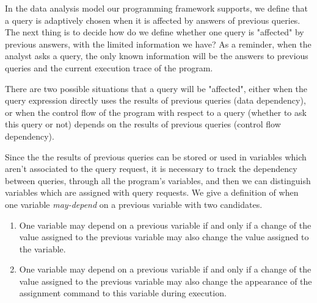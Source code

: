 
In the data analysis model our programming framework supports, 
   we define that a query is adaptively chosen when it is affected by answers of previous queries. The next thing is to decide how do we define whether one query is "affected" by previous answers, with the limited information we have? As a reminder, 
  when the analyst asks a query, the only known information will be the answers to previous queries and the current execution trace of the program.
 
 
 There are two possible situations that a query will be "affected",  
 either when the query expression directly uses the results of previous queries (data dependency), or when the control flow of the program with respect to a query (whether to ask this query or not) depends on the results of previous queries (control flow dependency).
 
 
 Since the the results of previous queries can be stored or used in variables
 which aren't associated to the query request,
 it is necessary to track the dependency between queries, through all the program's variables,  
 and then we can distinguish variables which are assigned with query requests.
  We give a definition of when one variable \emph{may-depend} on a previous variable with two candidates.
 {
 \begin{enumerate}
     \item One variable may depend on a previous variable if and only if a change of the value assigned to the previous variable may also change the value assigned to the variable.
     \item One variable may depend on a previous variable if and only if a change of the value assigned to the previous variable may also change the appearance of the assignment command to this variable 
     during execution.
 \end{enumerate}
 }
 
